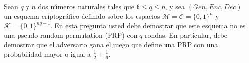 
Sean $q$ y $n$ dos números naturales tales que $6 \leq q \leq n$, y sea $(\textit{Gen}, \textit{Enc}, \textit{Dec})$ un esquema criptográfico definido sobre los espacios $\mathcal{M} = \mathcal{C} = \{0,1\}^n$ y $\mathcal{K} = \{0, 1\}^{nq - 1}$. En esta pregunta usted debe demostrar que este esquema no es una pseudo-random permutation (PRP) con $q$ rondas. En particular, debe demostrar que el adversario gana el juego que define una PRP con una probabilidad mayor o igual a $\frac{1}{2} + \frac{1}{6}$.
